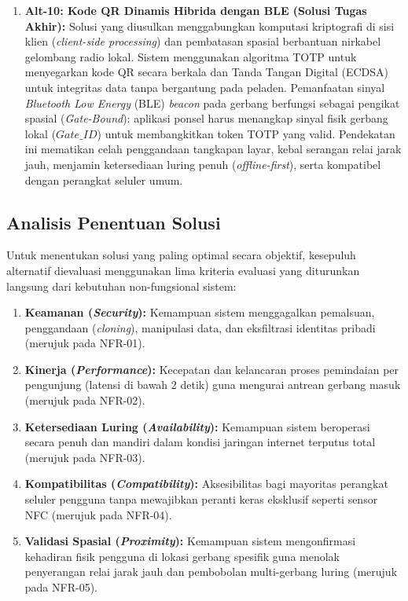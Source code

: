 \begin{enumerate}
    \item \textbf{Alt-10: Kode QR Dinamis Hibrida dengan BLE (Solusi Tugas Akhir):} Solusi yang diusulkan menggabungkan komputasi kriptografi di sisi klien (\textit{client-side processing}) dan pembatasan spasial berbantuan nirkabel gelombang radio lokal. Sistem menggunakan algoritma TOTP untuk menyegarkan kode QR secara berkala dan Tanda Tangan Digital (ECDSA) untuk integritas data tanpa bergantung pada peladen. Pemanfaatan sinyal \textit{Bluetooth Low Energy} (BLE) \textit{beacon} pada gerbang berfungsi sebagai pengikat spasial (\textit{Gate-Bound}): aplikasi ponsel harus menangkap sinyal fisik gerbang lokal ($Gate\_ID$) untuk membangkitkan token TOTP yang valid. Pendekatan ini mematikan celah penggandaan tangkapan layar, kebal serangan relai jarak jauh, menjamin ketersediaan luring penuh (\textit{offline-first}), serta kompatibel dengan perangkat seluler umum.
\end{enumerate}

\subsection{Analisis Penentuan Solusi}
\label{subsec:penentuan_solusi}
Untuk menentukan solusi yang paling optimal secara objektif, kesepuluh alternatif dievaluasi menggunakan lima kriteria evaluasi yang diturunkan langsung dari kebutuhan non-fungsional sistem:
\begin{enumerate}
    \item \textbf{Keamanan (\textit{Security}):} Kemampuan sistem menggagalkan pemalsuan, penggandaan (\textit{cloning}), manipulasi data, dan eksfiltrasi identitas pribadi (merujuk pada NFR-01).
    \item \textbf{Kinerja (\textit{Performance}):} Kecepatan dan kelancaran proses pemindaian per pengunjung (latensi di bawah 2 detik) guna mengurai antrean gerbang masuk (merujuk pada NFR-02).
    \item \textbf{Ketersediaan Luring (\textit{Availability}):} Kemampuan sistem beroperasi secara penuh dan mandiri dalam kondisi jaringan internet terputus total (merujuk pada NFR-03).
    \item \textbf{Kompatibilitas (\textit{Compatibility}):} Aksesibilitas bagi mayoritas perangkat seluler pengguna tanpa mewajibkan peranti keras eksklusif seperti sensor NFC (merujuk pada NFR-04).
    \item \textbf{Validasi Spasial (\textit{Proximity}):} Kemampuan sistem mengonfirmasi kehadiran fisik pengguna di lokasi gerbang spesifik guna menolak penyerangan relai jarak jauh dan pembobolan multi-gerbang luring (merujuk pada NFR-05).
\end{enumerate}

